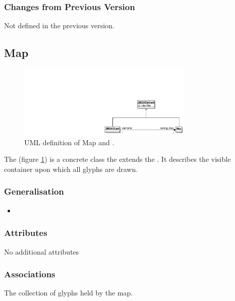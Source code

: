 \subsubsection{Changes from Previous Version}

Not defined in the previous version.

\subsection{Map}

\begin{figure}[h!]
  \centering
  \includegraphics[width=0.75\textwidth]{images/mapuml}
  \caption{UML definition of Map and .}
  \label{fig:mapuml}
\end{figure}

 The  (figure \ref{fig:mapuml}) is a concrete class the extends the
. It describes the visible container upon which
all glyphs are drawn.


\subsubsection{Generalisation}

\begin{itemize}
\item {}
\end{itemize}

\subsubsection{Attributes}

No additional attributes

\subsubsection{Associations}

\begin{attributes}
 The collection of glyphs held by the map. 
\end{attributes}

